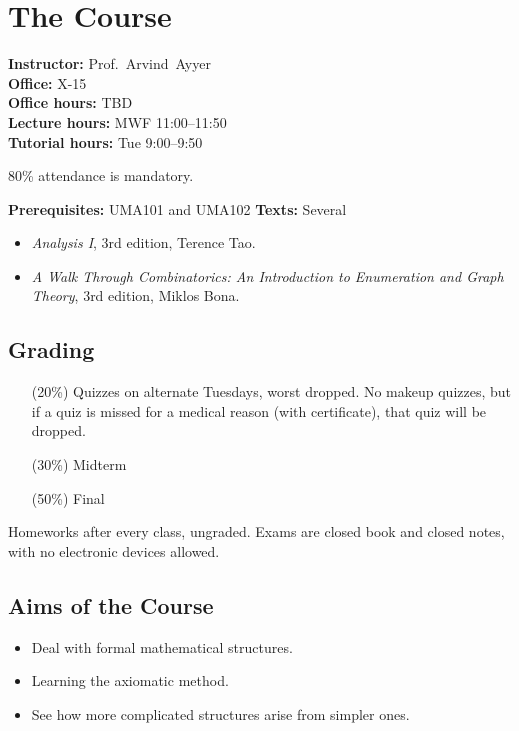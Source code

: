 \chapter*{The Course} \label{sec:course}

\textbf{Instructor:} Prof.~Arvind~Ayyer\\
\textbf{Office:} X-15\\
\textbf{Office hours:} TBD\\
\textbf{Lecture hours:} MWF 11:00--11:50\\
\textbf{Tutorial hours:} Tue 9:00--9:50

80\% attendance is mandatory.

\textbf{Prerequisites:} UMA101 and UMA102
\textbf{Texts:} Several
\begin{itemize}
    \item \textit{Analysis I}, 3rd edition, Terence Tao.
    \item \textit{A Walk Through Combinatorics:
    An Introduction to Enumeration and Graph Theory}, 3rd edition,
    Miklos Bona.
\end{itemize}

\section*{Grading} \label{sec:grading}
\begin{itemize}
    \item[(20\%)] Quizzes on alternate Tuesdays, worst dropped.
    No makeup quizzes, but if a quiz is missed for a medical reason
    (with certificate), that quiz will be dropped.
    \item[(30\%)] Midterm
    \item[(50\%)] Final
\end{itemize}
Homeworks after every class, ungraded.
Exams are closed book and closed notes, with no electronic devices allowed.

\section*{Aims of the Course} \label{sec:aims}
\begin{itemize}
    \item Deal with formal mathematical structures.
    \item Learning the axiomatic method.
    \item See how more complicated structures arise from simpler ones.
\end{itemize}

